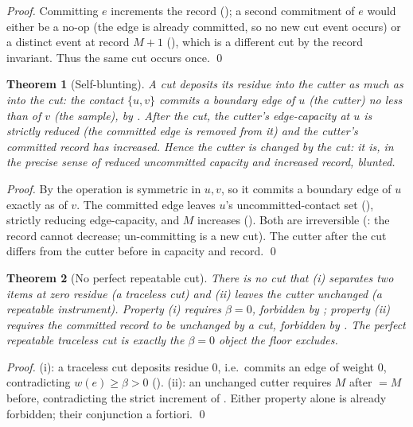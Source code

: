 \documentclass[11pt,twocolumn,a4paper]{article}
\theoremstyle{thmstyle}
\newtheorem{theorem}{Theorem}[section]
\theoremstyle{definition}
\theoremstyle{remark}
\newcommand{\wt}{w}
\newcommand{\flo}{\beta}                 %
\newcommand{\rec}{M}                     %
\begin{document}
\begin{proof}
Committing $e$ increments the record (); a second
commitment of $e$ would either be a no-op (the edge is already committed,
so no new cut event occurs) or a distinct event at record $\rec+1$
(), which is a different cut by the record invariant.
Thus the same cut occurs once. \qed
\end{proof}

\begin{theorem}[Self-blunting]
\label{thm:blunt}
A cut deposits its residue into the cutter as much as into the cut: the
contact $\{u,v\}$ commits a boundary edge of $u$ (the cutter) no less than
of $v$ (the sample), by . After the cut, the cutter's
edge-capacity at $u$ is strictly reduced (the committed edge is removed
from it) and the cutter's committed record has increased. Hence the cutter
is changed by the cut: it is, in the precise sense of reduced uncommitted
capacity and increased record, \emph{blunted}.
\end{theorem}

\begin{proof}
By  the operation is symmetric in $u,v$, so it commits a
boundary edge of $u$ exactly as of $v$. The committed edge leaves $u$'s
uncommitted-contact set (), strictly reducing
edge-capacity, and $\rec$ increases (). Both are
irreversible (: the record cannot decrease; un-committing
is a new cut). The cutter after the cut differs from the cutter before in
capacity and record. \qed
\end{proof}

\begin{theorem}[No perfect repeatable cut]
\label{thm:no-perfect}
There is no cut that (i) separates two items at zero residue (a traceless
cut) and (ii) leaves the cutter unchanged (a repeatable instrument).
Property (i) requires $\flo=0$, forbidden by ; property
(ii) requires the committed record to be unchanged by a cut, forbidden by
. The perfect repeatable traceless cut is exactly the
$\flo=0$ object the floor excludes.
\end{theorem}

\begin{proof}
(i): a traceless cut deposits residue $0$, i.e.\ commits an edge of weight
$0$, contradicting $\wt(e)\ge\flo>0$ (). (ii): an
unchanged cutter requires $\rec$ after $=\rec$ before, contradicting the
strict increment of . Either property alone is already
forbidden; their conjunction a fortiori. \qed
\end{proof}
\end{document}
